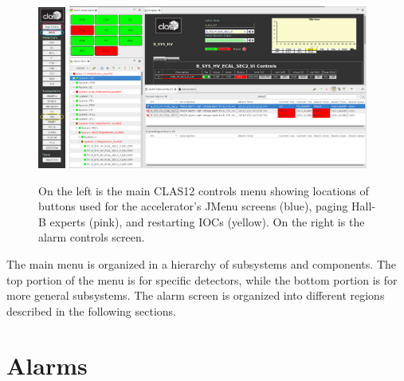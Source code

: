 \documentclass[amsmath,amssymb,notitlepage,11pt]{revtex4}
\begin{document}
\begin{figure}[htpb]\centering
    \includegraphics[width=0.08\textwidth]{pics/mainmenu}\hspace{0.5cm}
  \includegraphics[width=0.88\textwidth]{pics/clas12alarm}
  \caption{On the left is the main CLAS12 controls menu showing locations of buttons used for the accelerator's JMenu screens (blue), paging Hall-B experts (pink), and restarting IOCs (yellow).  On the right is the alarm controls screen.\label{fig:mainmenu}}
\end{figure}

The main menu is organized in a hierarchy of subsystems and components.  The top portion of the menu is for specific detectors, while the bottom portion is for more general subsystems.  The alarm screen is organized into different regions described in the following sections.

\section{Alarms}
\end{document}
